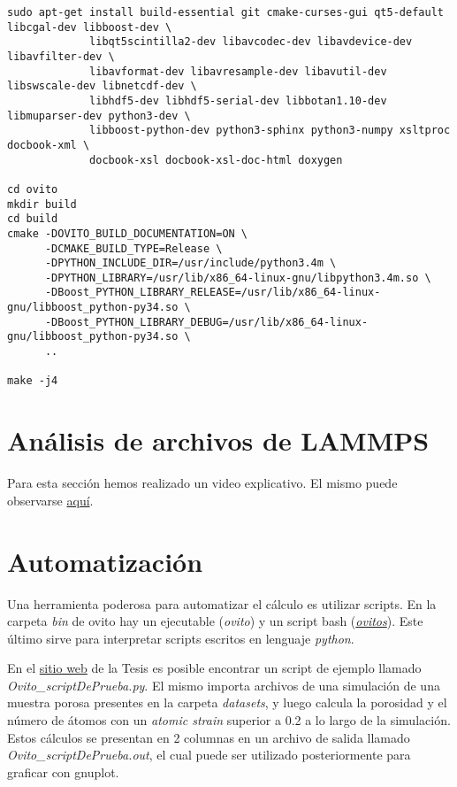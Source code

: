 \begin{lstlisting}
sudo apt-get install build-essential git cmake-curses-gui qt5-default libcgal-dev libboost-dev \
		     libqt5scintilla2-dev libavcodec-dev libavdevice-dev libavfilter-dev \
		     libavformat-dev libavresample-dev libavutil-dev libswscale-dev libnetcdf-dev \
		     libhdf5-dev libhdf5-serial-dev libbotan1.10-dev libmuparser-dev python3-dev \
		     libboost-python-dev python3-sphinx python3-numpy xsltproc docbook-xml \
		     docbook-xsl docbook-xsl-doc-html doxygen
                     
cd ovito
mkdir build
cd build
cmake -DOVITO_BUILD_DOCUMENTATION=ON \
      -DCMAKE_BUILD_TYPE=Release \
      -DPYTHON_INCLUDE_DIR=/usr/include/python3.4m \
      -DPYTHON_LIBRARY=/usr/lib/x86_64-linux-gnu/libpython3.4m.so \
      -DBoost_PYTHON_LIBRARY_RELEASE=/usr/lib/x86_64-linux-gnu/libboost_python-py34.so \
      -DBoost_PYTHON_LIBRARY_DEBUG=/usr/lib/x86_64-linux-gnu/libboost_python-py34.so \
      ..
      
make -j4
\end{lstlisting}

\section{Análisis de archivos de LAMMPS}
\label{AB_2}

Para esta sección hemos realizado un video explicativo. El mismo puede observarse \href{https://youtu.be/iGieWcpcQmQ}{aquí}.

\section{Automatización}
\label{AB_3}

Una herramienta poderosa para automatizar el cálculo es utilizar scripts. En la carpeta \textit{bin} de ovito hay un ejecutable (\textit{ovito}) y un script bash (\textit{\href{http://www.ovito.org/manual/python/introduction/running.html}{ovitos}}). Este último sirve para interpretar scripts escritos en lenguaje \textit{python}. 

En el \href{https://github.com/francoa/Tesis/tree/master/Resources}{sitio web} de la Tesis es posible encontrar un script de ejemplo llamado \textit{Ovito\_scriptDePrueba.py}. El mismo importa archivos de una simulación de una muestra porosa presentes en la carpeta \textit{datasets}, y luego calcula la porosidad y el número de átomos con un \textit{atomic strain} superior a 0.2 a lo largo de la simulación. Estos cálculos se presentan en 2 columnas en un archivo de salida llamado \textit{Ovito\_scriptDePrueba.out}, el cual puede ser utilizado posteriormente para graficar con gnuplot.

